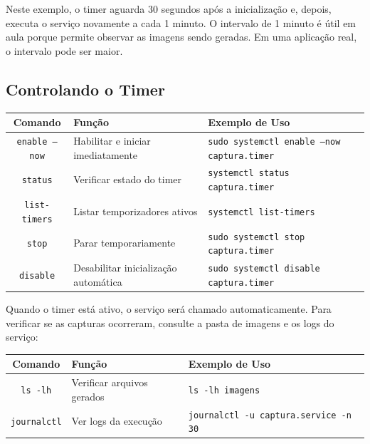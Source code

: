 \documentclass[12pt]{article}
\begin{document}
Neste exemplo, o timer aguarda 30 segundos após a inicialização e, depois, executa o serviço novamente a cada 1 minuto. O intervalo de 1 minuto é útil em aula porque permite observar as imagens sendo geradas. Em uma aplicação real, o intervalo pode ser maior.

\subsection{Controlando o Timer}

\begin{cmdbox}
\begin{tabularx}{\linewidth}{@{}C >{\raggedright\arraybackslash}X >{\raggedright\arraybackslash}X@{}}
\toprule
\textbf{Comando} & \textbf{Função} & \textbf{Exemplo de Uso} \\
\midrule
\texttt{enable --now} & Habilitar e iniciar imediatamente & \texttt{sudo systemctl enable --now captura.timer} \\
\texttt{status} & Verificar estado do timer & \texttt{systemctl status captura.timer} \\
\texttt{list-timers} & Listar temporizadores ativos & \texttt{systemctl list-timers} \\
\texttt{stop} & Parar temporariamente & \texttt{sudo systemctl stop captura.timer} \\
\texttt{disable} & Desabilitar inicialização automática & \texttt{sudo systemctl disable captura.timer} \\
\bottomrule
\end{tabularx}
\end{cmdbox}

Quando o timer está ativo, o serviço será chamado automaticamente. Para verificar se as capturas ocorreram, consulte a pasta de imagens e os logs do serviço:

\begin{cmdbox}
\begin{tabularx}{\linewidth}{@{}C >{\raggedright\arraybackslash}X >{\raggedright\arraybackslash}X@{}}
\toprule
\textbf{Comando} & \textbf{Função} & \textbf{Exemplo de Uso} \\
\midrule
\texttt{ls -lh} & Verificar arquivos gerados & \texttt{ls -lh imagens} \\
\texttt{journalctl} & Ver logs da execução & \texttt{journalctl -u captura.service -n 30} \\
\bottomrule
\end{tabularx}
\end{cmdbox}
\end{document}
